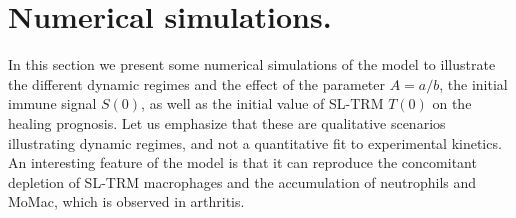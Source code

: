 \documentclass[a4paper, 12pt]{article}
\providecommand{\DIFaddtex}[1]{{\protect\color{blue} \sf #1}} %
\providecommand{\DIFaddbegin}{} %
\providecommand{\DIFaddend}{} %
\providecommand{\DIFadd}[1]{\texorpdfstring{\DIFaddtex{#1}}{#1}} %
\begin{document}
\section{Numerical simulations.}\label{sec:numerical_simulations}
In this section we present some numerical simulations of the model to illustrate the different dynamic regimes and the effect of the parameter $A=a/b$, the initial immune signal $S(0)$, as well as the initial value of SL-TRM $T(0)$ on the healing prognosis.
Let us emphasize that these are qualitative scenarios illustrating dynamic regimes, and not a quantitative fit to experimental kinetics.
\DIFaddbegin \DIFadd{An interesting feature of the model is that it can reproduce the concomitant depletion of SL-TRM macrophages and the accumulation of neutrophils and MoMac, which is observed in arthritis.%
}\DIFaddend 
\end{document}
